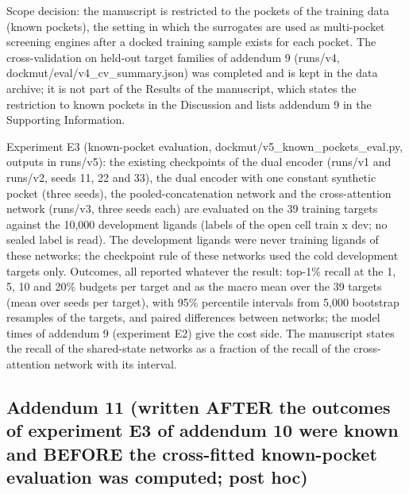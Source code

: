 Scope decision: the manuscript is restricted to the pockets of the training data (known pockets), the setting in which the surrogates are used as multi-pocket screening engines after a docked training sample exists for each pocket. The cross-validation on held-out target families of addendum 9 (runs/v4, dockmut/eval/v4\_cv\_summary.json) was completed and is kept in the data archive; it is not part of the Results of the manuscript, which states the restriction to known pockets in the Discussion and lists addendum 9 in the Supporting Information.

Experiment E3 (known-pocket evaluation, dockmut/v5\_known\_pockets\_eval.py, outputs in runs/v5): the existing checkpoints of the dual encoder (runs/v1 and runs/v2, seeds 11, 22 and 33), the dual encoder with one constant synthetic pocket (three seeds), the pooled-concatenation network and the cross-attention network (runs/v3, three seeds each) are evaluated on the 39 training targets against the 10,000 development ligands (labels of the open cell train x dev; no sealed label is read). The development ligands were never training ligands of these networks; the checkpoint rule of these networks used the cold development targets only. Outcomes, all reported whatever the result: top-1\% recall at the 1, 5, 10 and 20\% budgets per target and as the macro mean over the 39 targets (mean over seeds per target), with 95\% percentile intervals from 5,000 bootstrap resamples of the targets, and paired differences between networks; the model times of addendum 9 (experiment E2) give the cost side. The manuscript states the recall of the shared-state networks as a fraction of the recall of the cross-attention network with its interval.

\subsection*{Addendum 11 (written AFTER the outcomes of experiment E3 of addendum 10 were known and BEFORE the cross-fitted known-pocket evaluation was computed; post hoc)}


